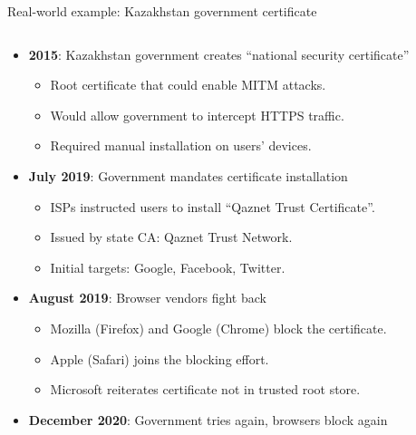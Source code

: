 \documentclass[aspectratio=169, lualatex, handout]{beamer}
\begin{document}
\begin{frame}{Real-world example: Kazakhstan government certificate}
	\begin{columns}[c]
		\begin{column}{0.8\textwidth}
			\begin{itemize}
				\item \textbf{2015}: Kazakhstan government creates ``national security certificate''
				      \begin{itemize}
					      \item Root certificate that could enable MITM attacks.
					      \item Would allow government to intercept HTTPS traffic.
					      \item Required manual installation on users' devices.
				      \end{itemize}
				\item \textbf{July 2019}: Government mandates certificate installation
				      \begin{itemize}
					      \item ISPs instructed users to install ``Qaznet Trust Certificate''.
					      \item Issued by state CA: Qaznet Trust Network.
					      \item Initial targets: Google, Facebook, Twitter.
				      \end{itemize}
				\item \textbf{August 2019}: Browser vendors fight back
				      \begin{itemize}
					      \item Mozilla (Firefox) and Google (Chrome) block the certificate.
					      \item Apple (Safari) joins the blocking effort.
					      \item Microsoft reiterates certificate not in trusted root store.
				      \end{itemize}
				\item \textbf{December 2020}: Government tries again, browsers block again
			\end{itemize}
		\end{column}
		\begin{column}{0.2\textwidth}
		\end{column}
	\end{columns}
\end{frame}
\end{document}
